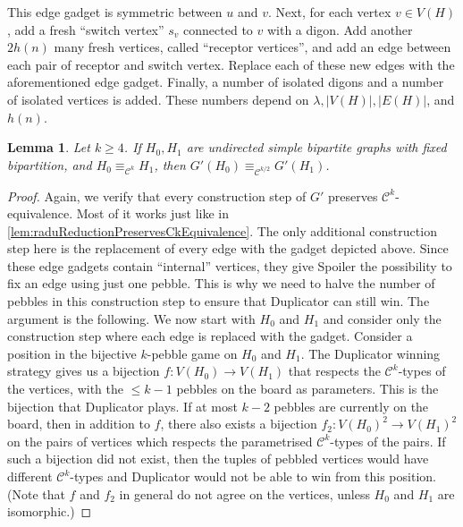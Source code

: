 \documentclass[10pt,a4paper]{article}
\theoremstyle{definition}
\theoremstyle{plain}
\newtheorem{lemma}[definition]{Lemma}
\theoremstyle{remark}
\begin{document}
This edge gadget is symmetric between $u$ and $v$. Next, for each vertex $v \in V(H)$, add a fresh \enquote{switch vertex} $s_v$ connected to $v$ with a digon. Add another $2h(n)$ many fresh vertices, called \enquote{receptor vertices}, and add an edge between each pair of receptor and switch vertex. Replace each of these new edges with the aforementioned edge gadget. 
Finally, a number of isolated digons and a number of isolated vertices is added. These numbers depend on $\lambda, |V(H)|, |E(H)|$, and $h(n)$.
\begin{lemma}
	\label{lem:raduReductionPreservesCkEquivalence2}
	Let $k \geq 4$.
	If $H_0, H_1$ are undirected simple bipartite graphs with fixed bipartition, and $H_0 \equiv_{\mathcal{C}^k} H_1$, then $G'(H_0) \equiv_{\mathcal{C}^{k/2}} G'(H_1)$.
\end{lemma}	
\begin{proof}
Again, we verify that every construction step of $G'$ preserves $\mathcal{C}^k$-equivalence. 
Most of it works just like in \cref{lem:raduReductionPreservesCkEquivalence}. The only additional construction step here is the replacement of every edge with the gadget depicted above. 
Since these edge gadgets contain ``internal'' vertices, they give Spoiler the possibility to fix an edge using just one pebble. This is why we need to halve the number of pebbles in this construction step to ensure that Duplicator can still win. 
The argument is the following. We now start with $H_0$ and $H_1$ and
consider only the construction step where each edge is replaced with
the gadget. Consider a position in the bijective $k$-pebble game on
$H_0$ and $H_1$. The Duplicator winning strategy gives us a bijection
$f\colon V(H_0) \to V(H_1)$ that respects the $\mathcal{C}^k$-types of
the vertices, with the $\leq k-1$ pebbles on the board as
parameters. This is the bijection that Duplicator plays. If at most
$k-2$ pebbles are currently on the board, then in addition to $f$,
there also exists a bijection $f_2\colon V(H_0)^2 \to V(H_1)^2$ on the
pairs of vertices which respects the parametrised
$\mathcal{C}^k$-types of the pairs. If such a bijection did not exist,
then the tuples of pebbled vertices would have different
$\mathcal{C}^k$-types and Duplicator would not be able to win from
this position. (Note that $f$ and $f_2$ in general do not agree on the vertices, unless $H_0$ and $H_1$ are isomorphic.)   

\end{proof}
\end{document}
